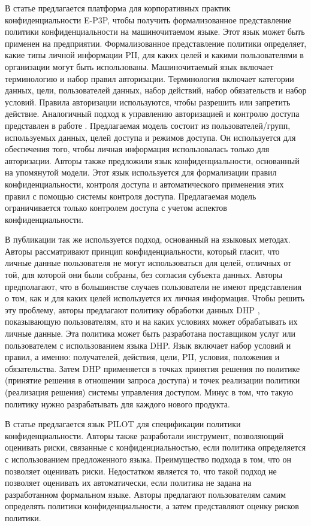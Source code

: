 \documentclass[../main]{subfiles}
\begin{document}
В статье \cite{MDPI11} предлагается платформа для корпоративных практик конфиденциальности E-P3P, чтобы получить формализованное представление политики конфиденциальности на машиночитаемом языке. Этот язык может быть применен на предприятии. Формализованное представление политики определяет, какие типы личной информации PII, для каких целей и какими пользователями в организации могут быть использованы. Машиночитаемый язык включает терминологию и набор правил авторизации. Терминология включает категории данных, цели, пользователей данных, набор действий, набор обязательств и набор условий. Правила авторизации используются, чтобы разрешить или запретить действие. Аналогичный подход к управлению авторизацией и контролю доступа представлен в работе \cite{MDPI12}. Предлагаемая модель состоит из пользователей/групп, используемых данных, целей доступа и режимов доступа. Он используется для обеспечения того, чтобы личная информация использовалась только для авторизации. Авторы \cite{MDPI12} также предложили язык конфиденциальности, основанный на упомянутой модели. Этот язык используется для формализации правил конфиденциальности, контроля доступа и автоматического применения этих правил с помощью системы контроля доступа. Предлагаемая модель ограничивается только контролем доступа с учетом аспектов конфиденциальности.

В публикации \cite{MDPI13} так же используется подход, основанный на языковых методах. Авторы \cite{MDPI13} рассматривают принцип конфиденциальности, который гласит, что личные данные пользователя не могут использоваться для целей, отличных от той, для которой они были собраны, без согласия субъекта данных. Авторы \cite{MDPI13} предполагают, что в большинстве случаев пользователи не имеют представления о том, как и для каких целей используется их личная информация. Чтобы решить эту проблему, авторы предлагают политику обработки данных DHP \cite{MDPI13}, показывающую пользователям, кто и на каких условиях может обрабатывать их личные данные. Эта политика может быть разработана поставщиком услуг или пользователем с использованием языка DHP. Язык включает набор условий и правил, а именно: получателей, действия, цели, PII, условия, положения и обязательства. Затем DHP применяется в точках принятия решения по политике (принятие решения в отношении запроса доступа) и точек реализации политики (реализация решения) системы управления доступом. Минус в том, что такую ​​политику нужно разрабатывать для каждого нового продукта.

В статье \cite{MDPI14} предлагается язык PILOT для спецификации политики конфиденциальности. Авторы также разработали инструмент, позволяющий оценивать риски, связанные с конфиденциальностью, если политика определяется с использованием предложенного языка. Преимущество подхода в том, что он позволяет оценивать риски. Недостатком является то, что такой подход не позволяет оценивать их автоматически, если политика не задана на разработанном формальном языке. Авторы предлагают пользователям самим определять политики конфиденциальности, а затем представляют оценку рисков политики.
\end{document}

